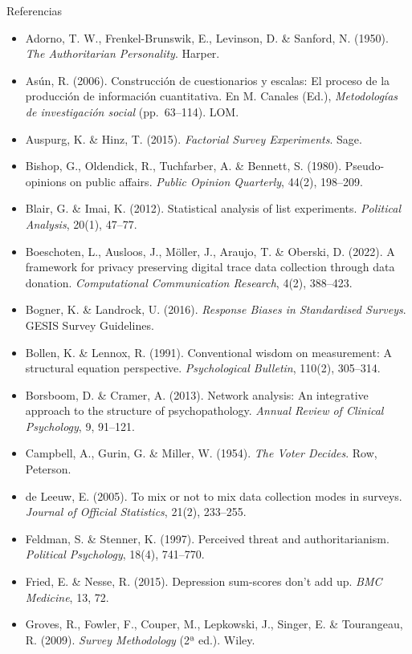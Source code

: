 \documentclass[aspectratio=169,11pt]{beamer}
\begin{document}
\begin{frame}[allowframebreaks]{Referencias}
\tiny
\begin{itemize}
\item[] Adorno, T. W., Frenkel-Brunswik, E., Levinson, D. \& Sanford, N. (1950). \emph{The Authoritarian Personality}. Harper.
\item[] Asún, R. (2006). Construcción de cuestionarios y escalas: El proceso de la producción de información cuantitativa. En M. Canales (Ed.), \emph{Metodologías de investigación social} (pp.~63--114). LOM.
\item[] Auspurg, K. \& Hinz, T. (2015). \emph{Factorial Survey Experiments}. Sage.
\item[] Bishop, G., Oldendick, R., Tuchfarber, A. \& Bennett, S. (1980). Pseudo-opinions on public affairs. \emph{Public Opinion Quarterly}, 44(2), 198--209.
\item[] Blair, G. \& Imai, K. (2012). Statistical analysis of list experiments. \emph{Political Analysis}, 20(1), 47--77.
\item[] Boeschoten, L., Ausloos, J., Möller, J., Araujo, T. \& Oberski, D. (2022). A framework for privacy preserving digital trace data collection through data donation. \emph{Computational Communication Research}, 4(2), 388--423.
\item[] Bogner, K. \& Landrock, U. (2016). \emph{Response Biases in Standardised Surveys}. GESIS Survey Guidelines.
\item[] Bollen, K. \& Lennox, R. (1991). Conventional wisdom on measurement: A structural equation perspective. \emph{Psychological Bulletin}, 110(2), 305--314.
\item[] Borsboom, D. \& Cramer, A. (2013). Network analysis: An integrative approach to the structure of psychopathology. \emph{Annual Review of Clinical Psychology}, 9, 91--121.
\item[] Campbell, A., Gurin, G. \& Miller, W. (1954). \emph{The Voter Decides}. Row, Peterson.
\item[] de Leeuw, E. (2005). To mix or not to mix data collection modes in surveys. \emph{Journal of Official Statistics}, 21(2), 233--255.
\item[] Feldman, S. \& Stenner, K. (1997). Perceived threat and authoritarianism. \emph{Political Psychology}, 18(4), 741--770.
\item[] Fried, E. \& Nesse, R. (2015). Depression sum-scores don't add up. \emph{BMC Medicine}, 13, 72.
\item[] Groves, R., Fowler, F., Couper, M., Lepkowski, J., Singer, E. \& Tourangeau, R. (2009). \emph{Survey Methodology} (2ª ed.). Wiley.

\end{itemize}
\end{frame}
\end{document}
